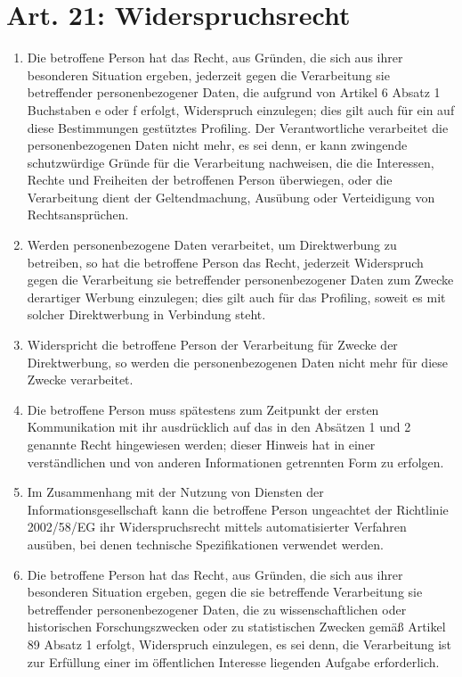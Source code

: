     \section{Art. 21: Widerspruchsrecht}
        \begin{enumerate}[label=(\arabic*]
            \item Die betroffene Person hat das Recht, aus Gründen, die sich aus ihrer besonderen Situation ergeben, jederzeit gegen die Verarbeitung sie betreffender personenbezogener Daten, die aufgrund von Artikel 6 Absatz 1 Buchstaben e oder f erfolgt, Widerspruch einzulegen; dies gilt auch für ein auf diese Bestimmungen gestütztes Profiling. Der Verantwortliche verarbeitet die personenbezogenen Daten nicht mehr, es sei denn, er kann zwingende schutzwürdige Gründe für die Verarbeitung nachweisen, die die Interessen, Rechte und Freiheiten der betroffenen Person überwiegen, oder die Verarbeitung dient der Geltendmachung, Ausübung oder Verteidigung von Rechtsansprüchen.
            \item Werden personenbezogene Daten verarbeitet, um Direktwerbung zu betreiben, so hat die betroffene Person das Recht, jederzeit Widerspruch gegen die Verarbeitung sie betreffender personenbezogener Daten zum Zwecke derartiger Werbung einzulegen; dies gilt auch für das Profiling, soweit es mit solcher Direktwerbung in Verbindung steht. 
            \item Widerspricht die betroffene Person der Verarbeitung für Zwecke der Direktwerbung, so werden die personenbezogenen Daten nicht mehr für diese Zwecke verarbeitet.
            \item Die betroffene Person muss spätestens zum Zeitpunkt der ersten Kommunikation mit ihr ausdrücklich auf das in den Absätzen 1 und 2 genannte Recht hingewiesen werden; dieser Hinweis hat in einer verständlichen und von anderen Informationen getrennten Form zu erfolgen.
            \item Im Zusammenhang mit der Nutzung von Diensten der Informationsgesellschaft kann die betroffene Person ungeachtet der Richtlinie 2002/58/EG ihr Widerspruchsrecht mittels automatisierter Verfahren ausüben, bei denen technische Spezifikationen verwendet werden. 
            \item Die betroffene Person hat das Recht, aus Gründen, die sich aus ihrer besonderen Situation ergeben, gegen die sie betreffende Verarbeitung sie betreffender personenbezogener Daten, die zu wissenschaftlichen oder historischen Forschungszwecken oder zu statistischen Zwecken gemäß Artikel 89 Absatz 1 erfolgt, Widerspruch einzulegen, es sei denn, die Verarbeitung ist zur Erfüllung einer im öffentlichen Interesse liegenden Aufgabe erforderlich. 
        \end{enumerate}


